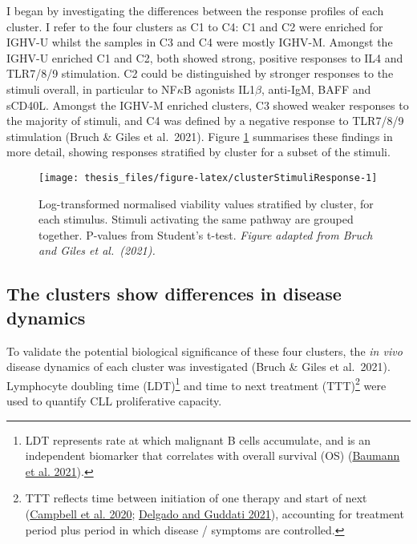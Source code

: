 \documentclass[11pt, a4paper, twosided]{book}
\begin{document}
I began by investigating the differences between the response profiles of each cluster. I refer to the four clusters as C1 to C4: C1 and C2 were enriched for IGHV-U whilst the samples in C3 and C4 were mostly IGHV-M. Amongst the IGHV-U enriched C1 and C2, both showed strong, positive responses to IL4 and TLR7/8/9 stimulation. C2 could be distinguished by stronger responses to the stimuli overall, in particular to NF\(\kappa\)B agonists IL1\(\beta\), anti-IgM, BAFF and sCD40L. Amongst the IGHV-M enriched clusters, C3 showed weaker responses to the majority of stimuli, and C4 was defined by a negative response to TLR7/8/9 stimulation (Bruch \& Giles et al.~2021). Figure \ref{fig:clusterStimuliResponse} summarises these findings in more detail, showing responses stratified by cluster for a subset of the stimuli.


\begin{figure}

{\centering \texttt{[image: thesis\_files/figure-latex/clusterStimuliResponse-1]} 

}

\caption{Log-transformed normalised viability values stratified by cluster, for each stimulus. Stimuli activating the same pathway are grouped together. P-values from Student's t-test. \emph{Figure adapted from Bruch and Giles et al.~(2021). }}\label{fig:clusterStimuliResponse}
\end{figure}
\hypertarget{cluster-survival}{%
\subsection{The clusters show differences in disease dynamics}\label{cluster-survival}}

To validate the potential biological significance of these four clusters, the \emph{in vivo} disease dynamics of each cluster was investigated (Bruch \& Giles et al.~2021). Lymphocyte doubling time (LDT)\footnote{LDT represents rate at which malignant B cells accumulate, and is an independent biomarker that correlates with overall survival (OS) (\protect\hyperlink{ref-Baumann2021}{Baumann et al. 2021}).} and time to next treatment (TTT)\footnote{TTT reflects time between initiation of one therapy and start of next (\protect\hyperlink{ref-Campbell2020}{Campbell et al. 2020}; \protect\hyperlink{ref-Delgado2021}{Delgado and Guddati 2021}), accounting for treatment period plus period in which disease / symptoms are controlled.} were used to quantify CLL proliferative capacity.
\end{document}
